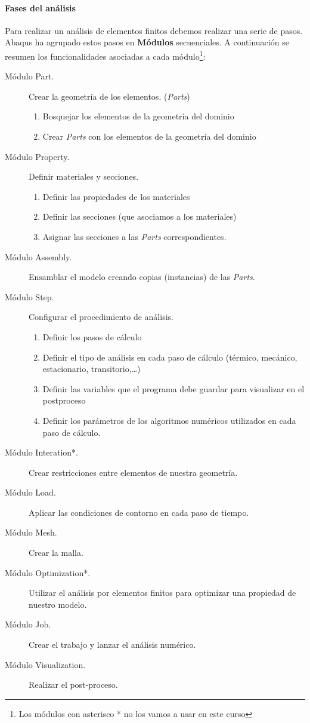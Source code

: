 \paragraph{Fases del análisis} Para realizar un análisis de elementos
finitos debemos realizar una serie de pasos. Abaqus ha agrupado estos
pasos en \textbf{Módulos} secuenciales. A continuación se resumen los
funcionalidades asociadas a cada módulo\footnote{Los módulos con
  asterisco * no los vamos a usar en este curso}:
\begin{description}
\item[Módulo Part.] Crear la geometría de los elementos.
  (\textit{Parts})
  \begin{enumerate}
  \item Bosquejar los elementos de la geometría del dominio
  \item Crear \textit{Parts} con los elementos de la geometría del
    dominio
  \end{enumerate}
\item[Módulo Property.] Definir materiales y secciones.
  \begin{enumerate}
  \item Definir las propiedades de los materiales
  \item Definir las secciones (que asociamos a los materiales)
  \item Asignar las secciones a las \textit{Parts} correspondientes.
  \end{enumerate}
\item[Módulo Assembly.] Ensamblar el modelo creando copias
  (instancias) de las \textit{Parts}.
\item[Módulo Step.] Configurar el procedimiento de análisis.
  \begin{enumerate}
  \item Definir los pasos de cálculo
  \item Definir el tipo de análisis en cada paso de cálculo (térmico,
    mecánico, estacionario, transitorio,\ldots)
  \item Definir las variables que el programa debe guardar para
    visualizar en el postproceso
  \item Definir los parámetros de los algoritmos numéricos utilizados
    en cada paso de cálculo.
  \end{enumerate}
\item[Módulo Interation*.] Crear restricciones entre elementos de
  nuestra geometría.
\item[Módulo Load.] Aplicar las condiciones de contorno en cada paso
  de tiempo.
\item[Módulo Mesh.] Crear la malla.
\item[Módulo Optimization*.] Utilizar el análisis por elementos
  finitos para optimizar una propiedad de nuestro modelo.
\item[Módulo Job.] Crear el trabajo y lanzar el análisis numérico.
\item[Módulo Visualization.] Realizar el post-proceso.
\end{description}
 


